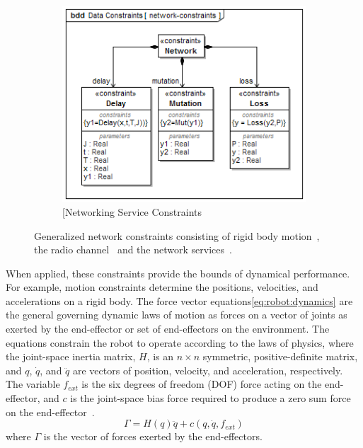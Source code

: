 \begin{figure}[ht]
	\begin{subfigure}{.8\textwidth}
	\centering
	\includegraphics[width=.8\linewidth]{./chapter-sysml/diagrams/bdd__Data_Constraints__network-constraints}  
	\caption{[Networking Service Constraints}
	\label{sysml:fig:constraints:network}
	\end{subfigure}

	\caption{Generalized network constraints consisting of rigid body motion~\protect{}, the radio channel~\protect{} and the network services~\protect{}.}
	\label{sysml:fig:general:constraints}	
	
\end{figure}

When applied, these constraints provide the bounds of dynamical performance.  For example, motion constraints determine the positions, velocities, and accelerations on a rigid body.  The force vector equations\eqref{eq:robot:dynamics} are the general governing dynamic laws of motion as forces on a vector of joints as exerted by the end-effector or set of end-effectors on the environment.  The equations constrain the robot to operate according to the laws of physics, where the joint-space inertia matrix, $H$, is an ${n}\times{n}$ symmetric, positive-definite matrix, and $q$, $\dot{q}$, and $\ddot{q}$ are vectors of position, velocity, and acceleration, respectively.  The variable $f_{ext}$ is the six degrees of freedom (DOF) force acting on the end-effector, and $c$ is the joint-space bias force required to produce a zero sum force on the end-effector~\cite{Featherstone2007}.  
\begin{equation}
\label{eq:robot:dynamics}
\Gamma = H(q) \ddot{q} + c(q,\dot{q},f_{\!ext})
\end{equation}    
where $\Gamma$ is the vector of forces exerted by the end-effectors.  

